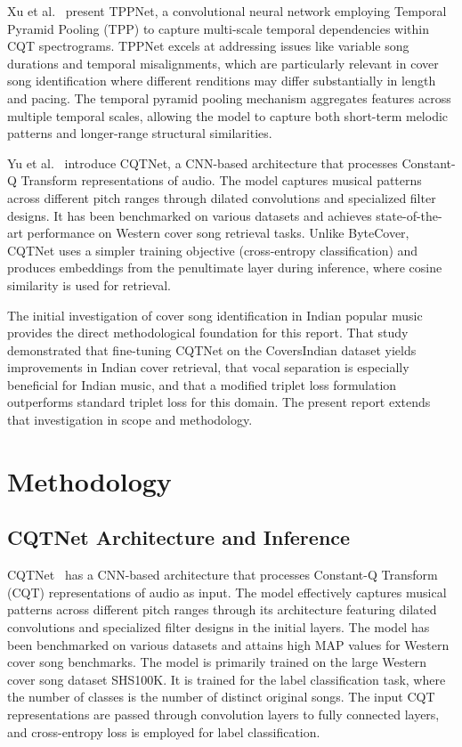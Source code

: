 \documentclass[conference]{IEEEtran}
\begin{document}
Xu et al.~\cite{xu2019tppnet} present TPPNet, a convolutional neural network employing Temporal Pyramid Pooling (TPP) to capture multi-scale temporal dependencies within CQT spectrograms. TPPNet excels at addressing issues like variable song durations and temporal misalignments, which are particularly relevant in cover song identification where different renditions may differ substantially in length and pacing. The temporal pyramid pooling mechanism aggregates features across multiple temporal scales, allowing the model to capture both short-term melodic patterns and longer-range structural similarities.

Yu et al.~\cite{yu2020cqtnet} introduce CQTNet, a CNN-based architecture that processes Constant-Q Transform representations of audio. The model captures musical patterns across different pitch ranges through dilated convolutions and specialized filter designs. It has been benchmarked on various datasets and achieves state-of-the-art performance on Western cover song retrieval tasks. Unlike ByteCover, CQTNet uses a simpler training objective (cross-entropy classification) and produces embeddings from the penultimate layer during inference, where cosine similarity is used for retrieval.

The initial investigation of cover song identification in Indian popular music~\cite{ismir_paper} provides the direct methodological foundation for this report. That study demonstrated that fine-tuning CQTNet on the CoversIndian dataset yields improvements in Indian cover retrieval, that vocal separation is especially beneficial for Indian music, and that a modified triplet loss formulation outperforms standard triplet loss for this domain. The present report extends that investigation in scope and methodology.


\section{Methodology}

\subsection{CQTNet Architecture and Inference}

CQTNet~\cite{yu2020cqtnet} has a CNN-based architecture that processes Constant-Q Transform (CQT) representations of audio as input. The model effectively captures musical patterns across different pitch ranges through its architecture featuring dilated convolutions and specialized filter designs in the initial layers. The model has been benchmarked on various datasets and attains high MAP values for Western cover song benchmarks. The model is primarily trained on the large Western cover song dataset SHS100K. It is trained for the label classification task, where the number of classes is the number of distinct original songs. The input CQT representations are passed through convolution layers to fully connected layers, and cross-entropy loss is employed for label classification.
\end{document}
